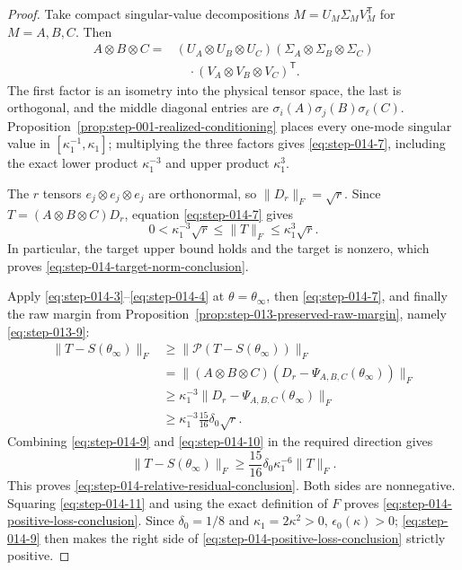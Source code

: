 \begin{proof}
Take compact singular-value decompositions
\(M=U_M\Sigma_MV_M^{\mathsf T}\) for \(M=A,B,C\). Then
\begin{equation}
\begin{aligned}
  A\otimes B\otimes C
  ={}&(U_A\otimes U_B\otimes U_C)
      (\Sigma_A\otimes\Sigma_B\otimes\Sigma_C)\\
     &\quad\cdot(V_A\otimes V_B\otimes V_C)^{\mathsf T}.
\end{aligned}\label{eq:step-014-8}
\end{equation}
The first factor is an isometry into the physical tensor space, the last is
orthogonal, and the middle diagonal entries are
\(\sigma_i(A)\sigma_j(B)\sigma_\ell(C)\). Proposition~\ref{prop:step-001-realized-conditioning}
places every one-mode singular value in
\([\kappa_1^{-1},\kappa_1]\); multiplying the three factors gives
\eqref{eq:step-014-7}, including the
exact lower product \(\kappa_1^{-3}\) and upper product \(\kappa_1^3\).

The \(r\) tensors \(e_j\otimes e_j\otimes e_j\) are orthonormal, so
\(\|D_r\|_F=\sqrt r\). Since
\(T=(A\otimes B\otimes C)D_r\), equation \eqref{eq:step-014-7} gives
\begin{equation}
  0<\kappa_1^{-3}\sqrt r
  \le\|T\|_F\le\kappa_1^3\sqrt r.                         \label{eq:step-014-9}
\end{equation}
In particular, the target upper bound holds and the target is nonzero, which
proves \eqref{eq:step-014-target-norm-conclusion}.

Apply \eqref{eq:step-014-3}--\eqref{eq:step-014-4} at \(\theta=\theta_\infty\), then \eqref{eq:step-014-7}, and finally the
raw margin from
Proposition~\ref{prop:step-013-preserved-raw-margin}, namely
\eqref{eq:step-013-9}:
\begin{equation}
\begin{aligned}
  \|T-S(\theta_\infty)\|_F
  &\ge\|\mathcal P(T-S(\theta_\infty))\|_F\\
  &=\|(A\otimes B\otimes C)
      (D_r-\Psi_{A,B,C}(\theta_\infty))\|_F\\
  &\ge\kappa_1^{-3}
      \|D_r-\Psi_{A,B,C}(\theta_\infty)\|_F\\
  &\ge\kappa_1^{-3}\frac{15}{16}\delta_0\sqrt r.
\end{aligned}\label{eq:step-014-10}
\end{equation}
Combining \eqref{eq:step-014-9} and \eqref{eq:step-014-10} in the required
direction gives
\begin{equation}
  \|T-S(\theta_\infty)\|_F
  \ge\frac{15}{16}\delta_0\kappa_1^{-6}\|T\|_F.          \label{eq:step-014-11}
\end{equation}
This proves \eqref{eq:step-014-relative-residual-conclusion}.
Both sides are nonnegative. Squaring \eqref{eq:step-014-11} and using the exact definition of
\(F\) proves \eqref{eq:step-014-positive-loss-conclusion}. Since \(\delta_0=1/8\) and
\(\kappa_1=2\kappa^2>0\), \(\epsilon_0(\kappa)>0\); \eqref{eq:step-014-9} then makes the
right side of \eqref{eq:step-014-positive-loss-conclusion} strictly positive.


\end{proof}
